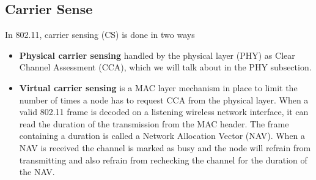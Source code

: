     \subsection{Carrier Sense}
     In 802.11, carrier sensing (CS) is done in two ways
     \begin{itemize}
     \item \textbf{Physical carrier sensing} handled by the physical layer (PHY) as Clear Channel Assessment (CCA), which we will talk about in the PHY subsection.
     \item \textbf{Virtual carrier sensing} is a MAC layer mechanism in place to limit the number of times
     a node has to request CCA from the physical layer. When a valid 802.11 frame is decoded on a listening wireless network interface, it can read the duration of
     the transmission from the MAC header. The frame containing a duration is called a Network Allocation Vector (NAV). When a NAV is received 
     the channel is marked as busy and the node will refrain from transmitting and also refrain from rechecking the channel for the duration of the NAV. 
     \end{itemize} 


